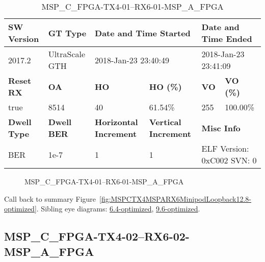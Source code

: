 \begin{table}[h]
\centering
\caption{MSP\_C\_FPGA-TX4-01--RX6-01-MSP\_A\_FPGA}
\label{tab:MSPCFPGATX401RX601MSPAFPGA12.8-optimized}
\begin{tabular}{@{}|l|l|l|l|l|l|@{}}
\toprule
\textbf{SW Version}                & \textbf{GT Type}   & \multicolumn{2}{l|}{\textbf{Date and Time Started}}            & \multicolumn{2}{l|}{\textbf{Date and Time Ended}}        \\ \midrule
2017.2                       & UltraScale GTH          & \multicolumn{2}{l|}{2018-Jan-23 23:40:49}                   & \multicolumn{2}{l|}{2018-Jan-23 23:41:09}               \\ \midrule
\textbf{Reset RX}                  & \textbf{OA} & \textbf{HO}   & \textbf{HO (\%)} & \textbf{VO} & \textbf{VO (\%)} \\ \midrule
true & 8514        & 40          & 61.54\%        & 255        & 100.00\%       \\ \midrule
\textbf{Dwell Type}                & \textbf{Dwell BER} & \textbf{Horizontal Increment} & \textbf{Vertical Increment}    & \multicolumn{2}{l|}{\textbf{Misc Info}}                  \\ \midrule
BER                            & 1e-7        & 1        & 1           & \multicolumn{2}{l|}{ELF Version: 0xC002 SVN: 0}                         \\ \bottomrule
\end{tabular}
\end{table}

\begin{figure}[h]
\caption{MSP\_C\_FPGA-TX4-01--RX6-01-MSP\_A\_FPGA} \label{fig:MSPCFPGATX401RX601MSPAFPGA12.8-optimized}
\end{figure}

Call back to summary Figure~\ref{fig:MSPCTX4MSPARX6MinipodLoopback12.8-optimized}.
Sibling eye diagrams: \hyperref[sec:MSPCFPGATX401RX601MSPAFPGA6.4-optimized]{6.4-optimized}, \hyperref[sec:MSPCFPGATX401RX601MSPAFPGA9.6-optimized]{9.6-optimized}.

\clearpage
\newpage


\subsection{MSP\_C\_FPGA-TX4-02--RX6-02-MSP\_A\_FPGA}\label{sec:MSPCFPGATX402RX602MSPAFPGA12.8-optimized}

